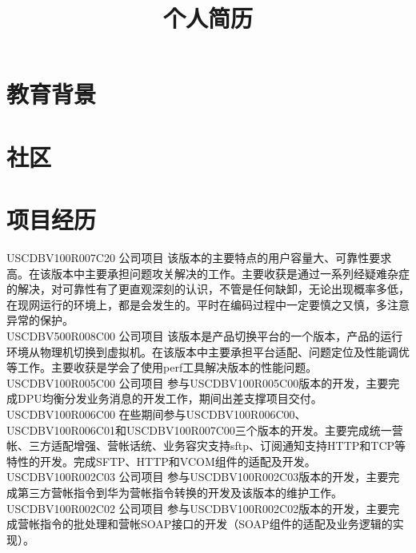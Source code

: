 \documentclass[11pt,a4paper]{moderncv}
\title{个人简历}                      %
\begin{document}
\maketitle

\section{教育背景}

\section{社区}

\section{项目经历}
\renewcommand{\baselinestretch}{1.6}

{USCDBV100R007C20}
{}
{公司项目}{}
{该版本的主要特点的用户容量大、可靠性要求高。在该版本中主要承担问题攻关解决的工作。主要收获是通过一系列经疑难杂症的解决，对可靠性有了更直观深刻的认识，不管是任何缺卸，无论出现概率多低，在现网运行的环境上，都是会发生的。平时在编码过程中一定要慎之又慎，多注意异常的保护。}\\

{USCDBV500R008C00}
{}
{公司项目}{}
{该版本是产品切换平台的一个版本，产品的运行环境从物理机切换到虚拟机。在该版本中主要承担平台适配、问题定位及性能调优等工作。主要收获是学会了使用perf工具解决版本的性能问题。}\\

{USCDBV100R005C00}
{}
{公司项目}{}
{参与USCDBV100R005C00版本的开发，主要完成DPU均衡分发业务消息的开发工作，期间出差支撑项目交付。}\\

{USCDBV100R006C00}
{}
{}{}
{在些期间参与USCDBV100R006C00、USCDBV100R006C01和USCDBV100R007C00三个版本的开发。主要完成统一营帐、三方适配增强、营帐话统、业务容灾支持sftp、订阅通知支持HTTP和TCP等特性的开发。完成SFTP、HTTP和VCOM组件的适配及开发。}\\

{USCDBV100R002C03}
{}
{公司项目}{}
{参与USCDBV100R002C03版本的开发，主要完成第三方营帐指令到华为营帐指令转换的开发及该版本的维护工作。}\\

{USCDBV100R002C02}
{}
{公司项目}{}
{参与USCDBV100R002C02版本的开发，主要完成营帐指令的批处理和营帐SOAP接口的开发（SOAP组件的适配及业务逻辑的实现）。}
\end{document}
